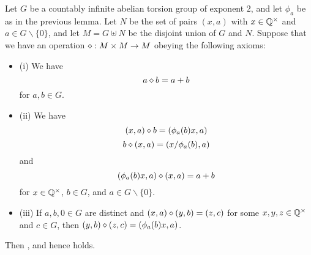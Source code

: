 \begin{lemma}\label{build-magma}\leanok{}  Let $G$ be a countably infinite abelian torsion group of exponent $2$, and let $\phi_a$ be as in the previous lemma.  Let $N$ be the set of pairs $(x,a)$ with $x \in \mathbb{Q}^\times$ and $a \in G \backslash \{0\}$, and let $M = G \uplus N$ be the disjoint union of $G$ and $N$.  Suppose that we have an operation $\diamond : M \times M \to M$ obeying the following axioms:
\begin{itemize}
\item (i) We have
\begin{equation}\label{op-0}
  a \diamond b = a+b
\end{equation}
for $a,b \in G$.
\item (ii) We have
 \begin{equation}\label{op-1}
  (x,a) \diamond b = (\phi_a(b) x, a)
 \end{equation}
 \begin{equation}\label{op-2}
   b \diamond (x,a) = (x / \phi_a(b), a)
 \end{equation}
 and
 \begin{equation}\label{op-3}
   (\phi_a(b) x,a) \diamond (x,a) = a+b
 \end{equation}
 for $x \in \mathbb{Q}^\times$, $b \in G$, and $a \in G \backslash \{0\}$.
\item (iii) If $a,b,0 \in G$ are distinct and
$(x,a) \diamond (y,b) = (z,c)$ for some $x,y,z \in \mathbb{Q}^\times$ and $c \in G$, then $(y,b) \diamond (z,c) = (\phi_a(b) x,a)$.
\end{itemize}
Then ,  and hence  holds.
\end{lemma}

